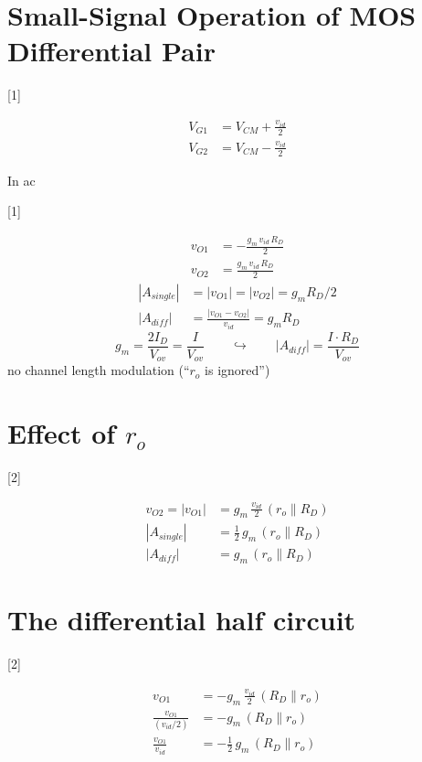 \documentclass[11pt,a4paper]{article}
\begin{document}

\section{Small-Signal Operation of MOS Differential Pair}
[1]

\begin{align*}
V_{G1} &= V_{CM} + \frac{v_{id}}{2} \\
V_{G2} &= V_{CM} - \frac{v_{id}}{2}
\end{align*}

In ac

[1]

\begin{align*}
v_{O1} &= -\frac{g_m\,v_{id}\,R_D}{2} \\
v_{O2} &= \frac{g_m\,v_{id}\,R_D}{2}
\end{align*}
\begin{align*}
|A_{single}| &= |v_{O1}| = |v_{O2}| = g_m R_D/2 \\
|A_{diff}| &= \frac{|v_{O1} - v_{O2}|}{v_{id}} = g_m R_D
\end{align*}
\[ g_m = \frac{2I_D}{V_{ov}} = \frac{I}{V_{ov}} \qquad \hookrightarrow \qquad |A_{diff}| = \frac{I \cdot R_D}{V_{ov}} \]
no channel length modulation (``$r_o$ is ignored'')

\section{Effect of $r_o$}
[2]

\begin{align*}
v_{O2} = |v_{O1}| &= g_m\,\frac{v_{id}}{2}\,(r_o \parallel R_D) \\
|A_{single}| &= \frac{1}{2}\,g_m\,(r_o \parallel R_D) \\
|A_{diff}| &= g_m\,(r_o \parallel R_D)
\end{align*}

\section{The differential half circuit}
[2]

\begin{align*}
v_{O1} &= -g_m\,\frac{v_{id}}{2}\,(R_D \parallel r_o) \\
\frac{v_{O1}}{(v_{id}/2)} &= -g_m\,(R_D \parallel r_o) \\
\frac{v_{O1}}{v_{id}} &= -\frac{1}{2}\,g_m\,(R_D \parallel r_o)
\end{align*}
\end{document}
